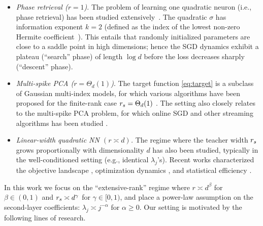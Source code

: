 \begin{itemize}[leftmargin=*,itemsep=0.6mm,topsep=0.6mm]
    \item \textit{Phase retrieval ($r =1$)}. The problem of learning one quadratic neuron (i.e., phase retrieval) has been studied extensively~\cite{fienup1982phase,chen2015solving,tan2019online}. The quadratic $\sigma$ has information exponent $k=2$ (defined as the index of the lowest non-zero Hermite coefficient~\cite{dudeja2018learning,benarous2021online}). This entails that randomly initialized parameters are close to a saddle point in high dimensions; hence the SGD dynamics exhibit a plateau (``search'' phase) of length $\log d$ before the loss decreases sharply (``descent'' phase). 
    \item \textit{Multi-spike PCA ($r = \Theta_d(1)$)}. The target function \eqref{eq:target} is a subclass of Gaussian multi-index models, for which various algorithms have been proposed for the finite-rank case $r_s = \Theta_d(1)$ \cite{chen2020learning,damian2022neural,bietti2023learning}. The setting also closely relates to the multi-spike PCA problem, for which online SGD \cite{arous2024high} and other streaming algorithms has been studied \cite{oja1985stochastic,jain2016streaming,allen2017first}. 
    
    \item \textit{Linear-width quadratic NN $(r \asymp d)$.} 
    The regime where the teacher width $r_s$ grows proportionally with dimensionality $d$ has also been studied, typically in the well-conditioned setting (e.g., identical $\lambda_j$'s). Recent works characterized the objective landscape \cite{soltanolkotabi2018theoretical,du2018power,venturi2019spurious,gamarnik2019stationary,ghorbani2019limitations}, optimization dynamics \cite{sarao2020optimization,martin2023impact}, and statistical efficiency \cite{maillard2024bayes,erba2025nuclear}.
\end{itemize}

In this work we focus on the ``extensive-rank'' regime where $r \asymp d^\beta$ for $\beta \in (0, 1)$ and $r_s \asymp d^{\gamma}$ for $\gamma \in [0,1)$, and place a power-law assumption on the second-layer coefficients: $\lambda_j\asymp j^{-\alpha}$ for $\alpha \geq 0$. Our setting is motivated by the following lines of research. 


